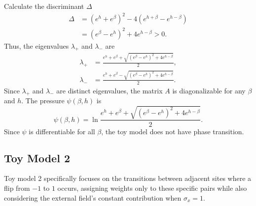 \documentclass[11pt]{book}
\begin{document}
Calculate the discriminant $\Delta$
\begin{align*}
\Delta &= (e^h + e^{\beta})^2 - 4 \left( e^{h + \beta} - e^{h - \beta} \right) \\
&= (e^{\beta} - e^h)^2 + 4 e^{h - \beta} > 0.
\end{align*}
Thus, the eigenvalues $\lambda_+$ and $\lambda_-$ are
\begin{align*}
\lambda_+ &= \frac{e^h + e^{\beta} + \sqrt{(e^{\beta} - e^h)^2 + 4 e^{h - \beta}}}{2}, \\
\lambda_- &= \frac{e^h + e^{\beta} - \sqrt{(e^{\beta} - e^h)^2 + 4 e^{h - \beta}}}{2}.
\end{align*}
Since $\lambda_+$ and $\lambda_-$ are distinct eigenvalues, the matrix $A$ is diagonalizable for any $\beta$ and $h$.
The pressure $\psi(\beta,h)$ is
\begin{equation}\label{toy_model_1_pressure}
\psi(\beta,h) = \ln \frac{e^h + e^{\beta} + \sqrt{(e^{\beta} - e^h)^2 + 4 e^{h - \beta}}}{2}.
\end{equation}
Since $\psi$ is differentiable for all $\beta$, the toy model does not have phase transition.

\subsection{Toy Model 2}
Toy model 2 specifically focuses on the transitions between adjacent sites where a flip from $-1$ to $1$ occurs, assigning weights only to these specific pairs while also considering the external field’s constant contribution when $\sigma_x = 1$.
\end{document}
